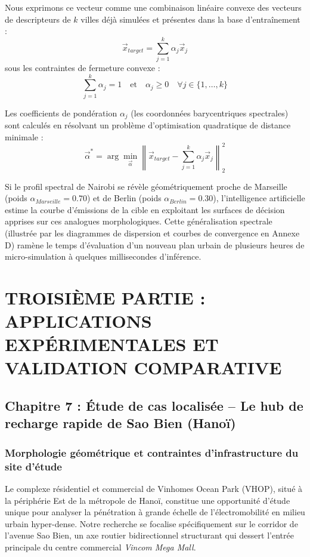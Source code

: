 \documentclass[11pt, a4paper]{article}
\begin{document}
Nous exprimons ce vecteur comme une combinaison linéaire convexe des
vecteurs de descripteurs de \(k\) villes déjà simulées et présentes dans
la base d'entraînement :
\[\vec{x}_{target} = \sum_{j=1}^k \alpha_j \vec{x}_j\] sous les
contraintes de fermeture convexe :
\[\sum_{j=1}^k \alpha_j = 1 \quad \text{et} \quad \alpha_j \ge 0 \quad \forall j \in \{1, \dots, k\}\]

Les coefficients de pondération \(\alpha_j\) (les coordonnées
barycentriques spectrales) sont calculés en résolvant un problème
d'optimisation quadratique de distance minimale :
\[\vec{\alpha}^* = \arg\min_{\vec{\alpha}} \left\| \vec{x}_{target} - \sum_{j=1}^k \alpha_j \vec{x}_j \right\|_2^2\]

Si le profil spectral de Nairobi se révèle géométriquement proche de
Marseille (poids \(\alpha_{Marseille} = 0.70\)) et de Berlin (poids
\(\alpha_{Berlin} = 0.30\)), l'intelligence artificielle estime la
courbe d'émissions de la cible en exploitant les surfaces de décision
apprises sur ces analogues morphologiques. Cette généralisation
spectrale (illustrée par les diagrammes de dispersion et courbes de
convergence en Annexe D) ramène le temps d'évaluation d'un nouveau plan
urbain de plusieurs heures de micro-simulation à quelques millisecondes
d'inférence.

\newpage

\section{TROISIÈME PARTIE : APPLICATIONS EXPÉRIMENTALES ET VALIDATION
COMPARATIVE}\label{troisiuxe8me-partie-applications-expuxe9rimentales-et-validation-comparative}

\subsection{Chapitre 7 : Étude de cas localisée -- Le hub de recharge
rapide de Sao Bien
(Hanoï)}\label{chapitre-7-uxe9tude-de-cas-localisuxe9e-le-hub-de-recharge-rapide-de-sao-bien-hanouxef}

\subsubsection{Morphologie géométrique et contraintes d'infrastructure
du site
d'étude}\label{morphologie-guxe9omuxe9trique-et-contraintes-dinfrastructure-du-site-duxe9tude}

Le complexe résidentiel et commercial de Vinhomes Ocean Park (VHOP),
situé à la périphérie Est de la métropole de Hanoï, constitue une
opportunité d'étude unique pour analyser la pénétration à grande échelle
de l'électromobilité en milieu urbain hyper-dense. Notre recherche se
focalise spécifiquement sur le corridor de l'avenue Sao Bien, un axe
routier bidirectionnel structurant qui dessert l'entrée principale du
centre commercial \emph{Vincom Mega Mall}.
\end{document}
